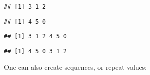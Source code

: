 \documentclass[paper=a4,10pt,div=17,headsepline,BCOR=12mm,twoside,open=right]{scrbook}\usepackage{knitr}
\begin{document}
\begin{knitrout}\footnotesize
{}\color{fgcolor}\begin{kframe}
\begin{alltt}
 \hlkwb{<-} \hlstd{(}\hlstd{,}\hlstd{,}\hlstd{)}
\end{alltt}
\begin{verbatim}
## [1] 3 1 2
\end{verbatim}
\begin{alltt}
 \hlkwb{<-} \hlstd{(}\hlstd{,}\hlstd{,}\hlstd{)}
\end{alltt}
\begin{verbatim}
## [1] 4 5 0
\end{verbatim}
\begin{alltt}
 \hlkwb{<-} 
\end{alltt}
\begin{verbatim}
## [1] 3 1 2 4 5 0
\end{verbatim}
\begin{alltt}
 \hlkwb{<-} 
\end{alltt}
\begin{verbatim}
## [1] 4 5 0 3 1 2
\end{verbatim}
\end{kframe}
\end{knitrout}

One can also create sequences, or repeat values:
\end{document}
